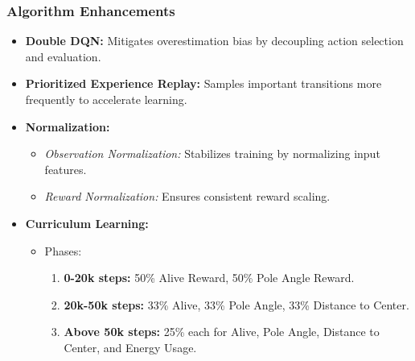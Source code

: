\documentclass{beamer}
\begin{document}
\begin{frame}
\frametitle{Algorithm Enhancements}
\begin{itemize}
    \item \textbf{Double DQN:} Mitigates overestimation bias by decoupling action selection and evaluation.
    \item \textbf{Prioritized Experience Replay:} Samples important transitions more frequently to accelerate learning.
    \item \textbf{Normalization:}
    \begin{itemize}
        \item \textit{Observation Normalization:} Stabilizes training by normalizing input features.
        \item \textit{Reward Normalization:} Ensures consistent reward scaling.
    \end{itemize}
    \item \textbf{Curriculum Learning:} 
    \begin{itemize}
        \item Phases:
        \begin{enumerate}
            \item \textbf{0-20k steps:} 50\% Alive Reward, 50\% Pole Angle Reward.
            \item \textbf{20k-50k steps:} 33\% Alive, 33\% Pole Angle, 33\% Distance to Center.
            \item \textbf{Above 50k steps:} 25\% each for Alive, Pole Angle, Distance to Center, and Energy Usage.
        \end{enumerate}
    \end{itemize}
\end{itemize}

\end{frame}
\end{document}
